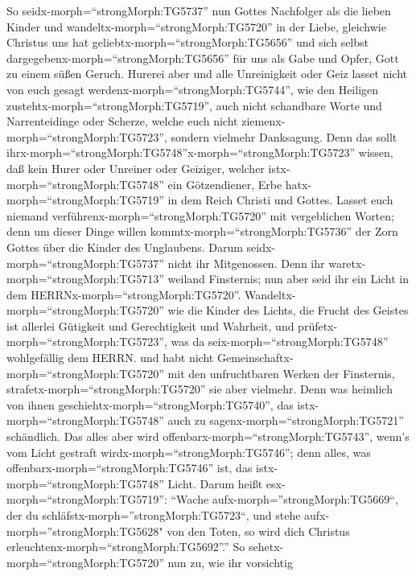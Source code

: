  So seidx-morph=``strongMorph:TG5737'' nun Gottes Nachfolger
als die lieben Kinder  und
wandeltx-morph=``strongMorph:TG5720'' in der Liebe, gleichwie Christus
uns hat geliebtx-morph=``strongMorph:TG5656'' und sich selbst
dargegebenx-morph=``strongMorph:TG5656'' für uns als Gabe und Opfer,
Gott zu einem süßen Geruch.  Hurerei aber und alle
Unreinigkeit oder Geiz lasset nicht von euch gesagt
werdenx-morph=``strongMorph:TG5744'', wie den Heiligen
zustehtx-morph=``strongMorph:TG5719'',  auch nicht
schandbare Worte und Narrenteidinge oder Scherze, welche euch nicht
ziemenx-morph=``strongMorph:TG5723'', sondern vielmehr Danksagung.
 Denn das sollt
ihrx-morph=``strongMorph:TG5748''x-morph=``strongMorph:TG5723'' wissen,
daß kein Hurer oder Unreiner oder Geiziger, welcher
istx-morph=``strongMorph:TG5748'' ein Götzendiener, Erbe
hatx-morph=``strongMorph:TG5719'' in dem Reich Christi und Gottes.
 Lasset euch niemand verführenx-morph=``strongMorph:TG5720''
mit vergeblichen Worten; denn um dieser Dinge willen
kommtx-morph=``strongMorph:TG5736'' der Zorn Gottes über die Kinder des
Unglaubens.  Darum seidx-morph=``strongMorph:TG5737'' nicht
ihr Mitgenossen.  Denn ihr
waretx-morph=``strongMorph:TG5713'' weiland Finsternis; nun aber seid
ihr ein Licht in dem HERRNx-morph=``strongMorph:TG5720''. 
Wandeltx-morph=``strongMorph:TG5720'' wie die Kinder des Lichts, die
Frucht des Geistes ist allerlei Gütigkeit und Gerechtigkeit und
Wahrheit,  und prüfetx-morph=``strongMorph:TG5723'', was da
seix-morph=``strongMorph:TG5748'' wohlgefällig dem HERRN. 
und habt nicht Gemeinschaftx-morph=``strongMorph:TG5720'' mit den
unfruchtbaren Werken der Finsternis,
strafetx-morph=``strongMorph:TG5720'' sie aber vielmehr. 
Denn was heimlich von ihnen geschiehtx-morph=``strongMorph:TG5740'', das
istx-morph=``strongMorph:TG5748'' auch zu
sagenx-morph=``strongMorph:TG5721'' schändlich.  Das alles
aber wird offenbarx-morph=``strongMorph:TG5743'', wenn's vom Licht
gestraft wirdx-morph=``strongMorph:TG5746''; denn alles, was
offenbarx-morph=``strongMorph:TG5746'' ist, das
istx-morph=``strongMorph:TG5748'' Licht.  Darum heißt
esx-morph=``strongMorph:TG5719'': ``Wache
aufx-morph=''strongMorph:TG5669``, der du
schläfstx-morph=''strongMorph:TG5723``, und stehe
aufx-morph=''strongMorph:TG5628" von den Toten, so wird dich Christus
erleuchtenx-morph=``strongMorph:TG5692''.''  So
sehetx-morph=``strongMorph:TG5720'' nun zu, wie ihr vorsichtig
